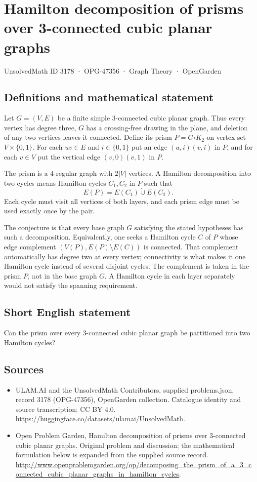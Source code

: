 \documentclass[11pt,a4paper]{article}
\begin{document}
\section*{Hamilton decomposition of prisms over 3-connected cubic planar graphs}\label{3178}
{\small UnsolvedMath ID 3178 · OPG-47356 · Graph Theory · OpenGarden}
\subsection{Definitions and mathematical statement}
Let $G=(V,E)$ be a finite simple $3$-connected cubic planar
graph. Thus every vertex has degree three, $G$ has a
crossing-free drawing in the plane, and deletion of any
two vertices leaves it connected. Define its prism
$P=G\square K_2$ on vertex set $V\times\{0,1\}$.
For each $uv\in E$ and $i\in\{0,1\}$ put an edge
$(u,i)(v,i)$ in $P$, and for each $v\in V$ put the
vertical edge $(v,0)(v,1)$ in $P$.

The prism is a $4$-regular graph with $2|V|$ vertices.
A Hamilton decomposition into two cycles means Hamilton
cycles $C_1,C_2$ in $P$ such that
\[
 E(P)=E(C_1)\mathbin{\dot\cup}E(C_2).
\]
Each cycle must visit all vertices of both layers, and
each prism edge must be used exactly once by the pair.

The conjecture is that every base graph $G$ satisfying
the stated hypotheses has such a decomposition. Equivalently,
one seeks a Hamilton cycle $C$ of $P$ whose edge complement
$(V(P),E(P)\setminus E(C))$ is connected. That complement
automatically has degree two at every vertex; connectivity
is what makes it one Hamilton cycle instead of several
disjoint cycles. The complement is taken in the prism $P$,
not in the base graph $G$. A Hamilton cycle in each layer
separately would not satisfy the spanning requirement.
\subsection{Short English statement}
Can the prism over every 3-connected cubic planar graph be partitioned into two Hamilton cycles?
\subsection{Sources}
\begin{itemize}
\item[S1] ULAM.AI and the UnsolvedMath Contributors, supplied problems.json, record 3178 (OPG-47356), OpenGarden collection. Catalogue identity and source transcription; CC BY 4.0.
\url{https://huggingface.co/datasets/ulamai/UnsolvedMath}.
\item[S2] Open Problem Garden, Hamilton decomposition of prisms over 3-connected cubic planar graphs. Original problem and discussion; the mathematical formulation below is expanded from the supplied source record.
\url{http://www.openproblemgarden.org/op/decomposing_the_prism_of_a_3_connected_cubic_planar_graphs_in_hamilton_cycles}.
\end{itemize}
\end{document}
